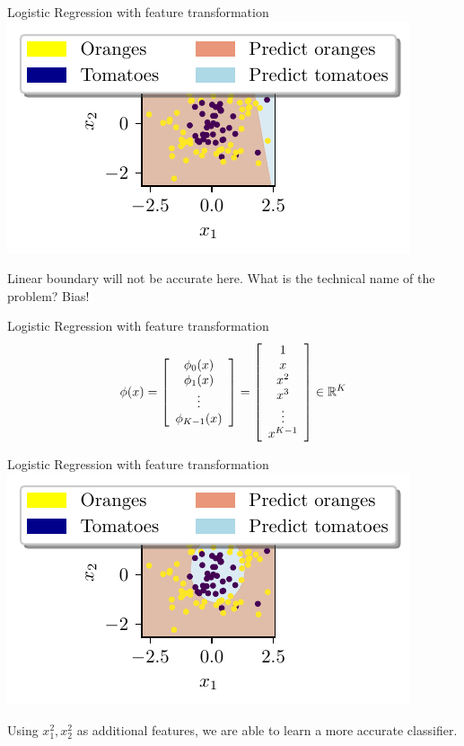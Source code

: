 \documentclass{beamer}
\begin{document}
\begin{frame}{Logistic Regression with feature transformation}
\includegraphics{../assets/logistic-regression/figures/logisitic-linear-prediction.pdf}

Linear boundary will not be accurate here. What is the technical name of the problem?
\pause Bias! 
\end{frame}

\begin{frame}{Logistic Regression with feature transformation}
$$
\phi(x)=\left[\begin{array}{c}
{\phi_{0}(x)} \\
{\phi_{1}(x)} \\
{\vdots} \\
{\phi_{K-1}(x)}
\end{array}\right]=\left[\begin{array}{c}
{1} \\
{x} \\
{x^{2}} \\
{x^{3}} \\
{\vdots} \\
{x^{K-1}}
\end{array}\right] \in \mathbb{R}^{K}
$$
\end{frame}


\begin{frame}{Logistic Regression with feature transformation}
\includegraphics{../assets/logistic-regression/figures/logisitic-circular-prediction.pdf}

Using $x_1^2, x_2^2$ as additional features, we are able to learn a more accurate classifier. 
\end{frame}
\end{document}

